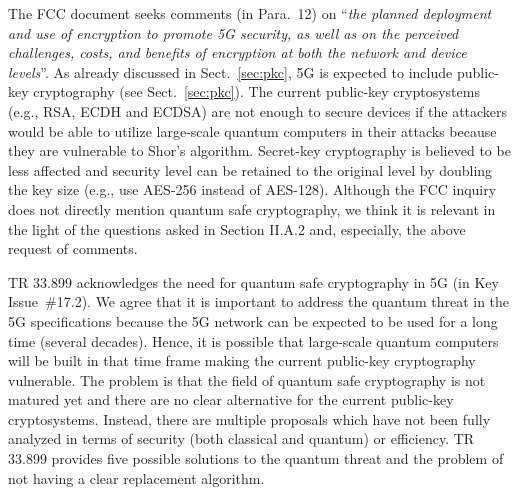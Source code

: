 \documentclass[12pt]{llncs}
\newcommand\ques[1]{``\emph{#1}''}
\begin{document}
The FCC document seeks comments (in Para.~12) on \ques{the planned deployment and use of encryption to promote 5G security, as well as on the perceived challenges, costs, and benefits of encryption at both the network and device levels}. As already discussed in Sect.~\ref{sec:pkc}, 5G is expected to include public-key cryptography (see Sect.~\ref{sec:pkc}). The current public-key cryptosystems (e.g., RSA, ECDH and ECDSA) are not enough to secure devices if the attackers would be able to utilize large-scale quantum computers in their attacks because they are vulnerable to Shor's algorithm. %
Secret-key cryptography is believed to be less affected and security level can be retained to the original level by doubling the key size (e.g., use AES-256 instead of AES-128). Although the FCC inquiry does not directly mention quantum safe cryptography, we think it is relevant in the light of the questions asked in Section II.A.2 and, especially, the above request of comments.

TR 33.899 acknowledges the need for quantum safe cryptography in 5G (in Key Issue~\#17.2). We agree that it is important to address the quantum threat in the 5G specifications because the 5G network can be expected to be used for a long time (several decades). Hence, it is possible that large-scale quantum computers will be built in that time frame making the current public-key cryptography vulnerable. The problem is that the field of quantum safe cryptography is not matured yet and there are no clear alternative for the current public-key cryptosystems. Instead, there are multiple proposals which have not been fully analyzed in terms of security (both classical and quantum) or efficiency. TR 33.899 provides five possible solutions to the quantum threat and the problem of not having a clear replacement algorithm.
\end{document}
